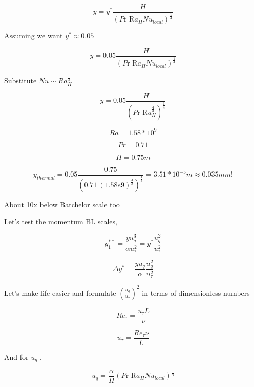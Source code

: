 \documentclass[12pt]{article}
\renewcommand{\_}{\kern-1.5pt\textunderscore\kern-1.5pt}
\begin{document}
 \[ y=y^{\ast}\frac{H}{ \left( P\text{r R}a_{H}Nu_{local} \right) ^{\frac{1}{4}}} \] \par

Assuming we want  \( y^{\ast} \approx 0.05 \) \par

 \[ y=0.05\frac{H}{ \left( P\text{r R}a_{H}Nu_{local} \right) ^{\frac{1}{4}}} \] \par


\vspace{\baselineskip}
Substitute  \( Nu \sim Ra_{H}^{\frac{1}{3}} \) \par

 \[ y=0.05\frac{H}{ \left( P\text{r R}a_{H}^{\frac{4}{3}} \right) ^{\frac{1}{4}}} \] \par

 \[ Ra=1.58\ast10^{9} \] \par

 \[ Pr=0.71 \] \par

 \[ H=0.75m \] \par

 \[ y_{thermal}=0.05\frac{0.75}{ \left( 0.71~ \left( 1.58e9 \right) ^{\frac{4}{3}} \right) ^{\frac{1}{4}}}=3.51\ast10^{-5}m \approx 0.035 mm! \] \par

About 10x below Batchelor scale too\par

Let’s test the momentum BL scales,\par

 \[ y_{1}^{\ast\ast}=\frac{yu_{q}^{3}}{ \alpha u_{ \tau}^{2}}=y^{\ast}\frac{u_{q}^{2}}{u_{ \tau}^{2}} \] \par

 \[  \Delta y^{\ast}=\frac{yu_{q}}{ \alpha }\frac{u_{q}^{2}}{u_{ \tau}^{2}} \] \par

Let’s make life easier and formulate  \(  \left( \frac{u_{q}}{u_{ \tau}} \right) ^{2} \)  in terms of dimensionless numbers\par

 \[ Re_{ \tau}=\frac{u_{ \tau}L}{ \nu } \] \par

 \[ u_{ \tau}=\frac{Re_{ \tau} \nu }{L} \] \par

And for  \( u_{q} \) ,\par


\vspace{\baselineskip}
 \[ u_{q}=\frac{ \alpha }{H} \left( P\text{r R}a_{H}Nu_{local} \right) ^{\frac{1}{4}} \] \par
\end{document}
